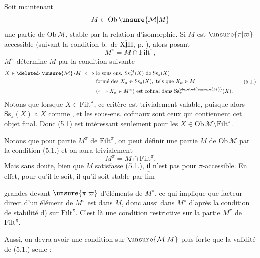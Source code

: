 
Soit maintenant
\[
 M\subset\mathrm{Ob}\,\unsure{\mathcal M|M}
\]
une partie de $\mathrm{Ob}\,\mathcal M$, stable par la relation d'isomorphie. Si $M$ est $\unsure{\pi|\varpi}$-accessible  (suivant la
condition $\mathrm b_\pi$ de $\overline{\underline{\mathrm{XIII}}}$, p. ), alors 
posant
\[
 M^\pi=M\cap\mathrm{Filt}^\pi,
\]
$M^\pi$ détermine $M$ par la condition suivante
\[
\begin{aligned}
 X\in \deleted{\unsure{\mathcal M}}M\ \Longleftrightarrow\ &\text{le sous ens. }\mathrm{Ss}^M_\pi(X)\text{ de }\mathrm{Ss}_\pi(X)\\
 &\text{formé des }X_\alpha\in\mathrm{Ss}_\pi(X),\text{ tels que }X_\alpha\in M\\
 &(\Longleftrightarrow X_\alpha\in M^\pi)\text{ est cofinal dans }\mathrm{Ss}^{\deleted{\unsure{M}}}_\pi(X).
\end{aligned}\tag*{(5.1.)}
\]
Notons que lorsque $X\in\mathrm{Filt}^\pi$, ce critère est
trivialement valable, puisque alors $\mathrm{Ss}_\pi(X)$ a
$X$ comme  , et les sous-ens.
cofinaux sont ceux qui contiennent
cet objet final. Donc (5.1) est intéressant
seulement pour les $X\in\mathrm{Ob}\,\mathcal M\setminus\mathrm{Filt}^\pi$.

Notons que pour \uline{} partie $M^\pi$ de
$\mathrm{Filt}^\pi$, on peut définir une partie $M$
de $\mathrm{Ob}\,\mathcal M$ par la condition (5.1.) et on
aura trivialement
\[
 M^\pi=M\cap\mathrm{Filt}^\pi.\tag*{(5.2.)}
\]
Mais sans doute, bien que $M$ satisfasse
(5.1.), il n'est pas pour  
$\pi$-accessible. En effet, pour qu'il le
soit, il  qu'il soit stable par $\underrightarrow{\mathrm{lim}}$


grandes devant $\unsure{\pi|\varpi}$ d'éléments de $M^\pi$, ce qui
implique que  facteur direct d'un
élément de $M^\pi$ est dans $M$, donc aussi
dans $M^\pi$ d'après la condition de stabilité
d) sur $\mathrm{Filt}^{\pi}$. C'est là une condition
restrictive sur la partie $M^\pi$ de $\mathrm{Filt}^{\pi}$.

Aussi, on devra avoir une condition
sur $\unsure{\mathcal M|M}$ plus forte que la validité de
(5.1.) seule :

